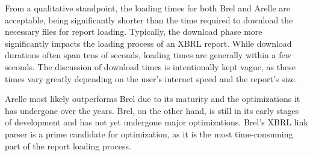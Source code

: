 From a qualitative standpoint, the loading times for both Brel and Arelle are acceptable,
being significantly shorter than the time required to download the necessary files for report loading.
Typically, the download phase more significantly impacts the loading process of an XBRL report.
While download durations often span tens of seconds, loading times are generally within a few seconds.
The discussion of download times is intentionally kept vague, as these times vary greatly depending on the user's internet speed and the report's size.

Arelle most likely outperforms Brel due to its maturity and the optimizations it has undergone over the years.
Brel, on the other hand, is still in its early stages of development and has not yet undergone major optimizations.
Brel's XBRL link parser is a prime candidate for optimization, as it is the most time-consuming part of the report loading process.
